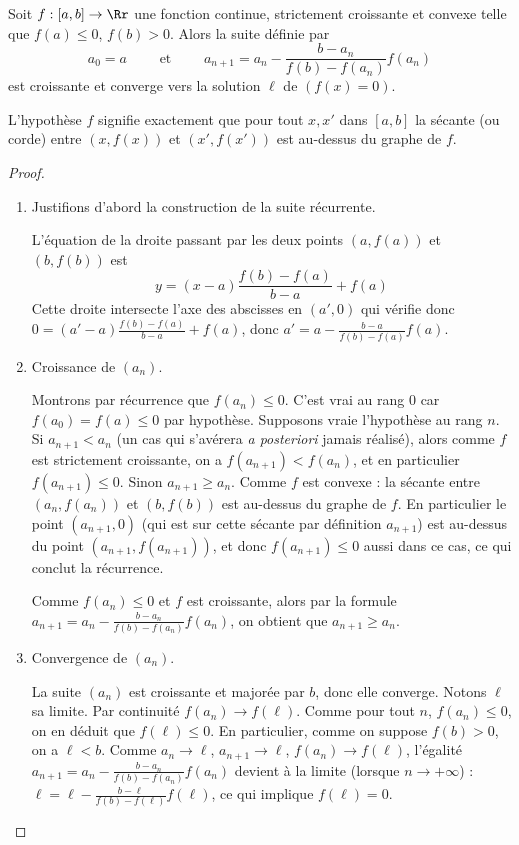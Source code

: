 \documentclass[class=report,crop=false]{standalone}
\begin{document}
\begin{proposition}
 Soit $f : [a,b] \to \Rr$ une fonction continue, strictement croissante et convexe telle
 que $f(a) \le 0$, $f(b) > 0$.
 Alors la suite définie par
 $$a_0=a \qquad \text{ et } \qquad a_{n+1} = a_n - \frac{b-a_n}{f(b)-f(a_n)}f(a_n)$$
 est croissante et converge vers la solution $\ell$ de $(f(x)=0)$.
\end{proposition}

L'hypothèse $f$  signifie exactement que pour tout $x,x'$
dans $[a,b]$ la sécante (ou corde) entre $(x,f(x))$ et $(x',f(x'))$ est au-dessus du graphe de $f$.


\begin{proof}
\begin{enumerate}
  \item Justifions d'abord la construction de la suite récurrente.

	  L'équation de la droite passant par les deux points $(a,f(a))$ et $(b,f(b))$
est
$$y=(x-a) \frac{f(b)-f(a)}{b-a} + f(a)$$
Cette droite intersecte l'axe des abscisses en $(a',0)$ qui vérifie donc
$0=(a'-a) \frac{f(b)-f(a)}{b-a} + f(a)$, donc $a'=a - \frac{b-a}{f(b)-f(a)}f(a)$.

  \item Croissance de $(a_n)$.

  Montrons par récurrence que $f(a_n)\le 0$. C'est vrai au rang $0$ car $f(a_0)=f(a)\le 0$ par hypothèse.  Supposons vraie l'hypothèse au rang $n$. Si $a_{n+1} < a_n$ (un cas qui s'avérera \emph{a posteriori} jamais réalisé), alors comme $f$ est strictement croissante, on a $f(a_{n+1})<f(a_n)$, et en particulier $f(a_{n+1})\le 0$. Sinon $a_{n+1}\ge a_n$. Comme $f$ est convexe : la sécante entre $(a_n, f(a_n))$ et $(b, f(b))$ est au-dessus du graphe de $f$. En particulier le point $(a_{n+1},0)$ (qui est sur cette sécante par définition $a_{n+1}$) est au-dessus du point $(a_{n+1},f(a_{n+1}))$, et donc $f(a_{n+1})\le 0$ aussi dans ce cas, ce qui conclut la récurrence.

  Comme $f(a_n) \le 0$ et $f$ est croissante, alors
  par la formule $a_{n+1} = a_n - \frac{b-a_n}{f(b)-f(a_n)}f(a_n)$, on obtient que $a_{n+1} \ge a_n$.


  \item Convergence de $(a_n)$.

  La suite $(a_n)$ est croissante et majorée par $b$, donc elle converge. Notons $\ell$ sa limite. Par continuité $f(a_n)\to f(\ell)$. Comme pour tout $n$, $f(a_n) \le 0$, on en déduit que $f(\ell)\le 0$. En particulier, comme on suppose $f(b)>0$, on a $\ell<b$. Comme $a_n \to \ell$, $a_{n+1} \to \ell$, $f(a_n)\to f(\ell)$, l'égalité $a_{n+1} = a_n - \frac{b-a_n}{f(b)-f(a_n)}f(a_n)$ devient à la limite (lorsque $n\to+\infty$) :
  $\ell = \ell - \frac{b-\ell}{f(b)-f(\ell)} f(\ell)$, ce qui implique $f(\ell)=0$.


\end{enumerate}
\end{proof}
\end{document}
